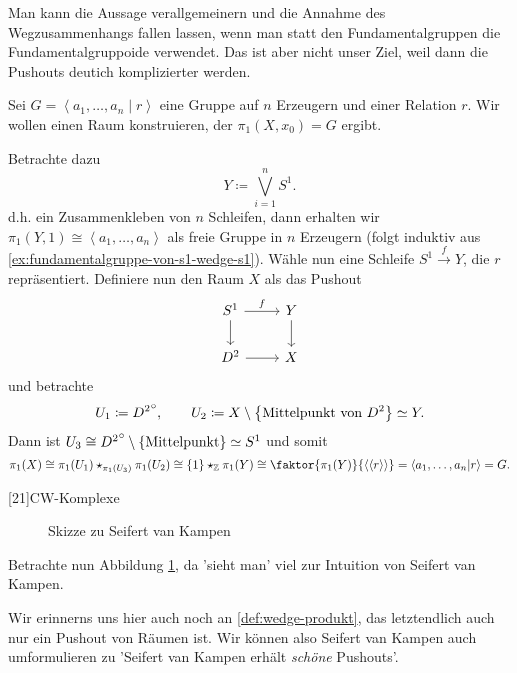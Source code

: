 \begin{oral}
    Man kann die Aussage verallgemeinern und die Annahme des Wegzusammenhangs fallen lassen, wenn man statt den Fundamentalgruppen die Fundamentalgruppoide verwendet. Das ist aber nicht unser Ziel, weil dann die Pushouts deutich komplizierter werden.
\end{oral}

\begin{example}
    Sei $G = \left< a_1,\ldots,a_n\mid r \right> $ eine Gruppe auf $n$ Erzeugern und einer Relation  $r$. Wir wollen einen Raum konstruieren, der  $\pi_1(X,x_0) = G$ ergibt.

    Betrachte dazu
    \[
    Y \coloneqq  \bigvee_{i=1}^{n} S^1
    .\] 
    d.h. ein Zusammenkleben von $n$ Schleifen, dann erhalten wir $\pi_1(Y,1) \cong \left< a_1,\ldots,a_n \right> $ als freie Gruppe in $n$ Erzeugern (folgt induktiv aus \autoref{ex:fundamentalgruppe-von-s1-wedge-s1}). Wähle nun eine Schleife $S^1 \stackrel{f}{\longrightarrow} Y$, die $r$ repräsentiert. Definiere nun den Raum  $X$ als das Pushout
     \[
    \begin{tikzcd}
        S^1 \ar[swap]{d}{} \ar{r}{f} & Y \ar{d}{} \\
        D^2 \ar[swap]{r}{} & X
    \end{tikzcd}
    \]
   und betrachte
   \[
       U_1 \coloneqq  {D^2}^\circ, \qquad U_2\coloneqq X \setminus \left \{\text{Mittelpunkt von $D^2$}\right\} \simeq Y
   .\] 
   Dann ist $U_3 \cong {D^2}^\circ \setminus \left \{\text{Mittelpunkt}\right\} \simeq S^1$ und somit
   \[
       \pi_1(X) \cong \pi_1(U_1) \star_{\pi_1(U_3)} \pi_1(U_2) \cong \left \{1\right\} \star_{\Z} \pi_1(Y) \cong \faktor{\pi_1(Y)}{\left< \left< r \right>  \right> } = \left< a_1,\ldots,a_n|r \right>  = G
   .\] 
\end{example}

[21]{CW-Komplexe}

\begin{figure}[ht]
    \centering
    \caption{Skizze zu Seifert van Kampen}
    \label{fig:skizze-zu-seifert-van-kampen}
\end{figure}

Betrachte nun Abbildung \ref{fig:skizze-zu-seifert-van-kampen}, da 'sieht man' viel zur Intuition von Seifert van Kampen.

Wir erinnerns uns hier auch noch an \autoref{def:wedge-produkt}, das letztendlich auch nur ein Pushout von Räumen ist. Wir können also Seifert van Kampen auch umformulieren zu 'Seifert van Kampen erhält \textit{schöne} Pushouts'.

